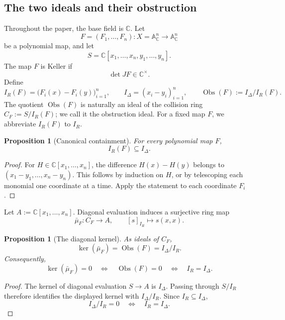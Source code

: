 \documentclass[11pt]{article}
\newtheorem{proposition}[theorem]{Proposition}
\theoremstyle{remark}
\theoremstyle{definition}
\newcommand{\A}{\mathbb A}
\newcommand{\C}{\mathbb C}
\newcommand{\Obs}{\operatorname{Obs}}
\begin{document}
\subsection{The two ideals and their obstruction}
\label{sec:collision-ideals}

Throughout the paper, the base field is \(\C\).  Let
\[
  F=(F_1,\dots,F_n)\colon
  X=\A^n_{\C}\longrightarrow\A^n_{\C}
\]
be a polynomial map, and let
\[
  S=\C[x_1,\dots,x_n,y_1,\dots,y_n].
\]
The map \(F\) is Keller if
\[
  \det JF\in\C^\times.
\]
Define
\[
  I_R(F)=\bigl(F_i(x)-F_i(y)\bigr)_{i=1}^{n},
  \qquad
  I_\Delta=(x_i-y_i)_{i=1}^{n},
  \qquad
  \Obs(F):=I_\Delta/I_R(F).
\]
The quotient \(\Obs(F)\) is naturally an ideal of the collision ring
\(C_F:=S/I_R(F)\); we call it the obstruction ideal.
For a fixed map \(F\), we abbreviate \(I_R(F)\) to \(I_R\).

\begin{proposition}[Canonical containment]
\label{prop:collision-contained-in-diagonal}
For every polynomial map \(F\),
\[
  I_R(F)\subseteq I_\Delta.
\]
\end{proposition}

\begin{proof}
For \(H\in\C[x_1,\dots,x_n]\), the difference \(H(x)-H(y)\) belongs to
\((x_1-y_1,\dots,x_n-y_n)\).  This follows by induction on \(H\), or by
telescoping each monomial one coordinate at a time.  Apply the statement
to each coordinate \(F_i\).
\end{proof}

Let \(A:=\C[x_1,\dots,x_n]\).  Diagonal evaluation induces a surjective ring
map
\[
  \bar\mu_F\colon C_F\longrightarrow A,
  \qquad
  [s]_{I_R}\longmapsto s(x,x).
\]

\begin{proposition}[The diagonal kernel]
\label{prop:obstruction-kernel}
As ideals of \(C_F\),
\[
  \ker(\bar\mu_F)
  =
  \Obs(F)
  =
  I_\Delta/I_R.
\]
Consequently,
\[
  \ker(\bar\mu_F)=0
  \quad\Longleftrightarrow\quad
  \Obs(F)=0
  \quad\Longleftrightarrow\quad
  I_R=I_\Delta.
\]
\end{proposition}

\begin{proof}
The kernel of diagonal evaluation \(S\to A\) is \(I_\Delta\).  Passing
through \(S/I_R\) therefore identifies the displayed kernel with
\(I_\Delta/I_R\).  Since \(I_R\subseteq I_\Delta\),
\[
  I_\Delta/I_R=0
  \quad\Longleftrightarrow\quad
  I_R=I_\Delta.
\]
\end{proof}
\end{document}
